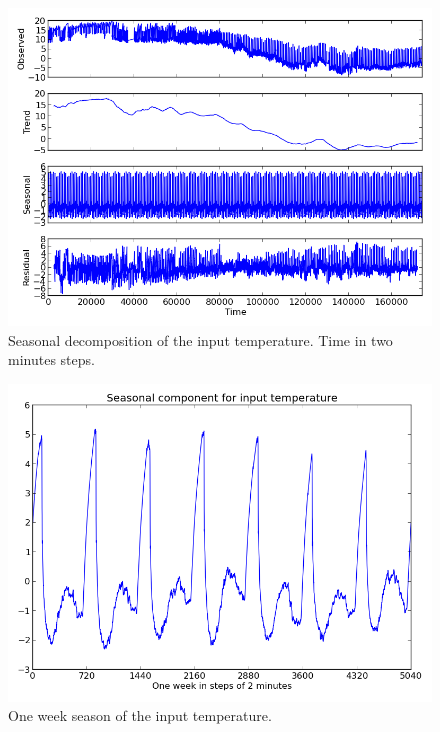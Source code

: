 \documentclass{scrartcl}
\begin{document}
\begin{figure}[H]
  \centering
  \includegraphics[width=0.5\linewidth]{img/seasondecomposition-input-temperature.png}
  \caption{Seasonal decomposition of the input temperature. Time in two minutes steps.}
  \label{fig:decomp}
\end{figure}

\begin{figure}[H]
  \centering
  \includegraphics[width=0.5\linewidth]{img/season-input-temperature.png}
  \caption{One week season of the input temperature.}
  \label{fig:season}
\end{figure}
\end{document}
